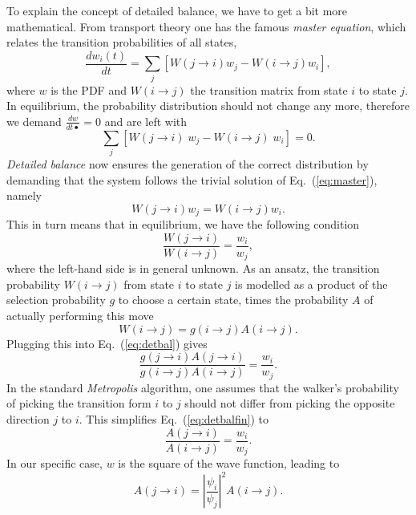 To explain the concept of detailed balance, we have to get a bit more mathematical. From transport theory one has the famous \textit{master equation}, which relates the transition probabilities of all states,
\[
\frac{d w_i(t)}{dt} = \sum\limits_j \left[W(j \rightarrow i)w_j - W(i \rightarrow j)w_i\right],
\]
where $w$ is the PDF and $W(i \rightarrow j)$ the transition matrix from state $i$ to state $j$. In equilibrium, the probability distribution should not change any more, therefore we demand $\frac{dw}{dt•} = 0$ and are left with
\begin{equation}
\sum\limits_j \left[W(j \rightarrow i)\;w_j - W(i \rightarrow j)\;w_i\right] = 0.
\label{eq:master}
\end{equation}
\textit{Detailed balance} now ensures the generation of the correct distribution by demanding that the system follows the trivial solution of Eq.~(\ref{eq:master}), namely
\[
W(j \rightarrow i)w_j = W(i \rightarrow j)w_i.
\]
This in turn means that in equilibrium, we have the following condition
\begin{equation}
\frac{W(j \rightarrow i)}{W(i \rightarrow j)} = \frac{w_i}{w_j},
\label{eq:detbal}
\end{equation}
where the left-hand side is in general unknown. As an ansatz, the transition probability $W(i \rightarrow j)$ from state $i$ to state $j$ is modelled as a product of the selection probability $g$ to choose a certain state, times the probability $A$ of actually performing this move
\begin{equation*}
W(i \rightarrow j) = g(i \rightarrow j) A(i \rightarrow j).
\end{equation*}
Plugging this into Eq.~(\ref{eq:detbal}) gives
\begin{equation}
\frac{g(j \rightarrow i) A(j \rightarrow i)}{g(i \rightarrow j) A(i \rightarrow j)} = \frac{w_i}{w_j}.
\label{eq:detbalfin}
\end{equation}
In the standard \textit{Metropolis} algorithm, one assumes that the walker's probability of picking the transition form $i$ to $j$ should not differ from picking the opposite direction $j$ to $i$.  This simplifies Eq.~(\ref{eq:detbalfin}) to
\[
\frac{A(j \rightarrow i)}{A(i \rightarrow j)} = \frac{w_i}{w_j}.
\]
In our specific case, $w$ is the square of the wave function,
leading to
\begin{equation}
A(j \rightarrow i) = \left|\frac{\psi_i}{\psi_j}\right|^2 A(i \rightarrow j).
\label{eq:AA}
\end{equation}

